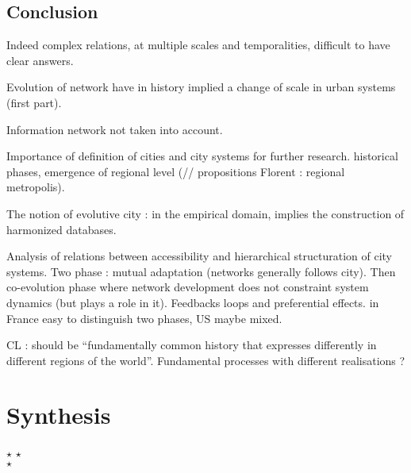 \subsection*{Conclusion}

Indeed complex relations, at multiple scales and temporalities, difficult to have clear answers.

Evolution of network have in history implied a change of scale in urban systems (first part).

Information network not taken into account.

Importance of definition of cities and city systems for further research. historical phases, emergence of regional level (// propositions Florent : regional metropolis).

The notion of evolutive city : in the empirical domain, implies the construction of harmonized databases.

Analysis of relations between accessibility and hierarchical structuration of city systems. Two phase : mutual adaptation (networks generally follows city). Then co-evolution phase where network development does not constraint system dynamics (but plays a role in it). Feedbacks loops and preferential effects. in France easy to distinguish two phases, US maybe mixed.

CL : should be ``fundamentally common history that expresses differently in different regions of the world''. Fundamental processes with different realisations ?




\section{Synthesis}



{\centering
$\star$ \hspace{0.8cm} $\star$\\\medskip
\centering $\star$\\
}








